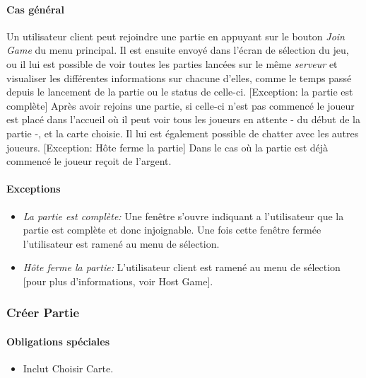\documentclass[a4paper,11pt]{report}
\begin{document}
\paragraph{Cas général}
Un utilisateur client peut rejoindre une partie en appuyant sur le bouton \og \textit{Join Game} \fg 
du menu principal.
Il est ensuite envoyé dans l'écran de sélection du jeu, ou il lui est possible de voir toutes les parties lancées sur le
même \textit{serveur} et visualiser les différentes informations sur chacune d'elles, comme le temps passé depuis le lancement
de la partie ou le status de celle-ci.
[Exception: la partie est complète]
Après avoir rejoins une partie, si celle-ci n'est pas commencé le joueur est placé dans l’accueil où il peut
voir tous les joueurs en attente - du début de la partie -, et la carte choisie. Il lui
est également possible de chatter avec les autres joueurs. 
[Exception: Hôte ferme la partie]
Dans le cas où la partie est déjà commencé le joueur reçoit de l'argent.
\paragraph{Exceptions}
\begin{itemize}
 \item \textit{La partie est complète:} Une fenêtre s'ouvre indiquant a l'utilisateur que la partie est complète
 et donc injoignable. Une fois cette fenêtre fermée l'utilisateur est ramené au menu de sélection.
 \item \textit{Hôte ferme la partie:} L'utilisateur client est ramené au menu de sélection [pour plus d'informations, voir
 Host Game]. 
\end{itemize}

\subsubsection{Créer Partie}
\paragraph{Obligations spéciales}
\begin{itemize}
 \item Inclut Choisir Carte.
\end{itemize}
\end{document}
